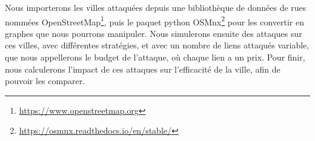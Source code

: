 Nous importerons les villes attaquées depuis une bibliothèque de données de rues nommées OpenStreetMap\footnote{\url{https://www.openstreetmap.org}}, puis le paquet python OSMnx\footnote{\url{https://osmnx.readthedocs.io/en/stable/}} pour les convertir en graphes que nous pourrons manipuler.
Nous simulerons ensuite des attaques sur ces villes, avec différentes stratégies, et avec un nombre de liens attaqués variable, que nous appellerons le budget de l'attaque, où chaque lien a un prix.
Pour finir, nous calculerons l'impact de ces attaques sur l'efficacité de la ville, afin de pouvoir les comparer.